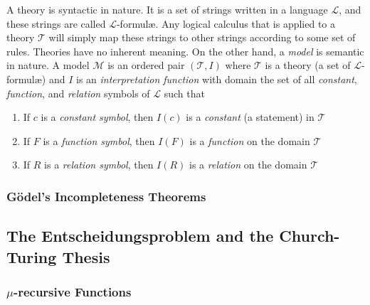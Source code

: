 A theory is syntactic in nature. It is a set of strings written in a language $\mathcal{L}$, and these strings are called $\mathcal{L}$-formul{\ae}. Any logical calculus that is applied to a theory $\mathcal{T}$ will simply map these strings to other strings according to some set of rules. Theories have no inherent meaning. On the other hand, a \textit{model} is semantic in nature. A model $\mathcal{M}$ is an ordered pair $(\mathcal{T},I)$ where $\mathcal{T}$ is a theory (a set of $\mathcal{L}$-formul{\ae}) and $I$ is an \textit{interpretation function} with domain the set of all \textit{constant}, \textit{function}, and \textit{relation} symbols of $\mathcal{L}$ such that

\begin{enumerate}
	\item If $c$ is a \textit{constant symbol}, then $I(c)$ is a \textit{constant} (a statement) in $\mathcal{T}$
	\item If $F$ is a \textit{function symbol}, then $I(F)$ is a \textit{function} on the domain $\mathcal{T}$
	\item If $R$ is a \textit{relation symbol}, then $I(R)$ is a \textit{relation} on the domain $\mathcal{T}$
\end{enumerate}

\subsubsection{G\"odel's Incompleteness Theorems}






\subsection{The Entscheidungsproblem and the Church-Turing Thesis}

\subsubsection{$\mu$-recursive Functions}

